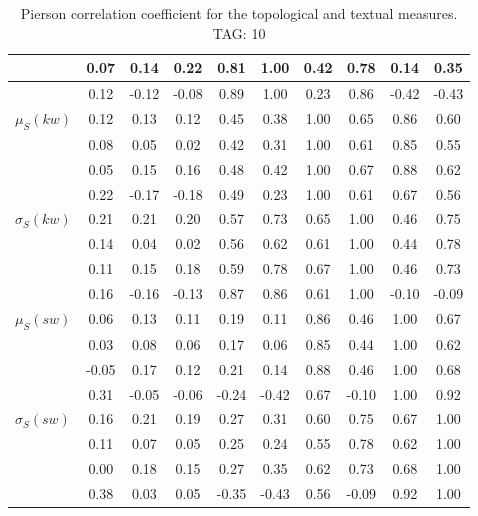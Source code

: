 \begin{table*}[h!]
\begin{center}
\begin{tabular}{| l | c | c | c | c | c | c | c | c | c |}
 & 0.07  & 0.14  & 0.22  & 0.81  & 1.00  & 0.42  & 0.78  & 0.14  & 0.35 \\\hline
 & 0.12  & -0.12  & -0.08  & 0.89  & 1.00  & 0.23  & 0.86  & -0.42  & -0.43 \\\hline
$\mu_S(kw)$ & 0.12  & 0.13  & 0.12  & 0.45  & 0.38  & 1.00  & 0.65  & 0.86  & 0.60 \\\hline
 & 0.08  & 0.05  & 0.02  & 0.42  & 0.31  & 1.00  & 0.61  & 0.85  & 0.55 \\\hline
 & 0.05  & 0.15  & 0.16  & 0.48  & 0.42  & 1.00  & 0.67  & 0.88  & 0.62 \\\hline
 & 0.22  & -0.17  & -0.18  & 0.49  & 0.23  & 1.00  & 0.61  & 0.67  & 0.56 \\\hline
$\sigma_S(kw)$ & 0.21  & 0.21  & 0.20  & 0.57  & 0.73  & 0.65  & 1.00  & 0.46  & 0.75 \\\hline
 & 0.14  & 0.04  & 0.02  & 0.56  & 0.62  & 0.61  & 1.00  & 0.44  & 0.78 \\\hline
 & 0.11  & 0.15  & 0.18  & 0.59  & 0.78  & 0.67  & 1.00  & 0.46  & 0.73 \\\hline
 & 0.16  & -0.16  & -0.13  & 0.87  & 0.86  & 0.61  & 1.00  & -0.10  & -0.09 \\\hline
$\mu_S(sw)$ & 0.06  & 0.13  & 0.11  & 0.19  & 0.11  & 0.86  & 0.46  & 1.00  & 0.67 \\\hline
 & 0.03  & 0.08  & 0.06  & 0.17  & 0.06  & 0.85  & 0.44  & 1.00  & 0.62 \\\hline
 & -0.05  & 0.17  & 0.12  & 0.21  & 0.14  & 0.88  & 0.46  & 1.00  & 0.68 \\\hline
 & 0.31  & -0.05  & -0.06  & -0.24  & -0.42  & 0.67  & -0.10  & 1.00  & 0.92 \\\hline
$\sigma_S(sw)$ & 0.16  & 0.21  & 0.19  & 0.27  & 0.31  & 0.60  & 0.75  & 0.67  & 1.00 \\\hline
 & 0.11  & 0.07  & 0.05  & 0.25  & 0.24  & 0.55  & 0.78  & 0.62  & 1.00 \\\hline
 & 0.00  & 0.18  & 0.15  & 0.27  & 0.35  & 0.62  & 0.73  & 0.68  & 1.00 \\\hline
 & 0.38  & 0.03  & 0.05  & -0.35  & -0.43  & 0.56  & -0.09  & 0.92  & 1.00 \\\hline
\end{tabular}
\caption{Pierson correlation coefficient for the topological and textual measures. TAG: 10}
\end{center}
\end{table*}